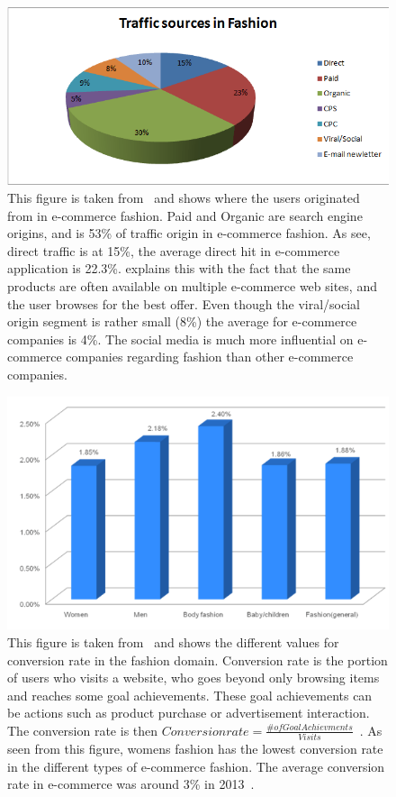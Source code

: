     \begin{figure}[H]
        \includegraphics[width=5in]{image/trafficSourcesInFashion.png}
        \centering
        \caption[Traffic Sources In Fashion]{This figure is taken from~\cite{Jorij2012} and shows where the users originated from in e-commerce fashion.
        Paid and Organic are search engine origins, and is 53\% of traffic origin in e-commerce fashion.
        As see, direct traffic is at 15\%, the average direct hit in e-commerce application is 22.3\%.
        \cite{Jorij2012} explains this with the fact that the same products are often available on multiple e-commerce web sites, and the user browses for the best offer.
        Even though the viral/social origin segment is rather small (8\%) the average for e-commerce companies is 4\%.
        The social media is much more influential on e-commerce companies regarding fashion than other e-commerce companies.}
    \end{figure}

    \begin{figure}[H]
        \includegraphics[width=5in]{image/conversionRate.png}
        \centering
        \caption[Conversion Rate in Fashion Retail]{This figure is taken from~\cite{Jorij2012} and shows the different values for conversion rate in the fashion domain.
        Conversion rate is the portion of users who visits a website, who goes beyond only browsing items and reaches some goal achievements.
        These goal achievements can be actions such as product purchase or advertisement interaction.
        The conversion rate is then $Conversion rate = \frac{\# of Goal Achievments}{Visits}$~\cite{nielsen2013}.
        As seen from this figure, womens fashion has the lowest conversion rate in the different types of e-commerce fashion.
        The average conversion rate in e-commerce was around 3\% in 2013~\cite{nielsen2013}.
        }
    \end{figure}

